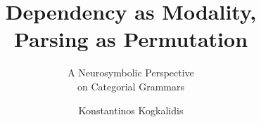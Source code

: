 \documentclass[utrecht]{lotdiss}
\title{Dependency as Modality, \\Parsing as Permutation}
\subtitle{A Neurosymbolic Perspective\\
on Categorial Grammars}
\author{Konstantinos Kogkalidis}
\begin{document}
\FrontMatter


\MainMatter







\appendix


\BackMatter


\end{document}
